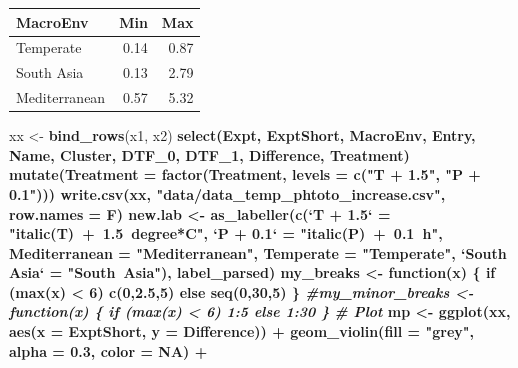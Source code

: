\documentclass[
]{article}
\newenvironment{Shaded}{\begin{snugshade}}{\end{snugshade}}
\newcommand{\CommentTok}[1]{\textcolor[rgb]{0.56,0.35,0.01}{\textit{#1}}}
\newcommand{\ControlFlowTok}[1]{\textcolor[rgb]{0.13,0.29,0.53}{\textbf{#1}}}
\newcommand{\DataTypeTok}[1]{\textcolor[rgb]{0.13,0.29,0.53}{#1}}
\newcommand{\DecValTok}[1]{\textcolor[rgb]{0.00,0.00,0.81}{#1}}
\newcommand{\FloatTok}[1]{\textcolor[rgb]{0.00,0.00,0.81}{#1}}
\newcommand{\KeywordTok}[1]{\textcolor[rgb]{0.13,0.29,0.53}{\textbf{#1}}}
\newcommand{\NormalTok}[1]{#1}
\newcommand{\OperatorTok}[1]{\textcolor[rgb]{0.81,0.36,0.00}{\textbf{#1}}}
\newcommand{\OtherTok}[1]{\textcolor[rgb]{0.56,0.35,0.01}{#1}}
\newcommand{\StringTok}[1]{\textcolor[rgb]{0.31,0.60,0.02}{#1}}
\begin{document}
\begin{longtable}[]{@{}lrr@{}}
\toprule
MacroEnv & Min & Max\tabularnewline
\midrule
\endhead
Temperate & 0.14 & 0.87\tabularnewline
South Asia & 0.13 & 2.79\tabularnewline
Mediterranean & 0.57 & 5.32\tabularnewline
\bottomrule
\end{longtable}

\begin{Shaded}
\begin{Highlighting}[]
\NormalTok{xx <-}\StringTok{ }\KeywordTok{bind_rows}\NormalTok{(x1, x2) }\OperatorTok{%
\StringTok{  }\KeywordTok{select}\NormalTok{(Expt, ExptShort, MacroEnv, Entry, Name, Cluster, }
\NormalTok{         DTF_}\DecValTok{0}\NormalTok{, DTF_}\DecValTok{1}\NormalTok{, Difference, Treatment) }\OperatorTok{%
\StringTok{  }\KeywordTok{mutate}\NormalTok{(}\DataTypeTok{Treatment =} \KeywordTok{factor}\NormalTok{(Treatment, }\DataTypeTok{levels =} \KeywordTok{c}\NormalTok{(}\StringTok{"T + 1.5"}\NormalTok{, }\StringTok{"P + 0.1"}\NormalTok{)))}
\KeywordTok{write.csv}\NormalTok{(xx, }\StringTok{"data/data_temp_phtoto_increase.csv"}\NormalTok{, }\DataTypeTok{row.names =}\NormalTok{ F)}
\NormalTok{new.lab <-}\StringTok{ }\KeywordTok{as_labeller}\NormalTok{(}\KeywordTok{c}\NormalTok{(}\StringTok{`}\DataTypeTok{T + 1.5}\StringTok{`}\NormalTok{ =}\StringTok{ "italic(T)~+~1.5~degree*C"}\NormalTok{, }
    \StringTok{`}\DataTypeTok{P + 0.1}\StringTok{`}\NormalTok{ =}\StringTok{ "italic(P)~+~0.1~h"}\NormalTok{, }\DataTypeTok{Mediterranean =} \StringTok{"Mediterranean"}\NormalTok{, }
    \DataTypeTok{Temperate =} \StringTok{"Temperate"}\NormalTok{, }\StringTok{`}\DataTypeTok{South Asia}\StringTok{`}\NormalTok{ =}\StringTok{ "South~Asia"}\NormalTok{), label_parsed)}
\NormalTok{my_breaks <-}\StringTok{ }\ControlFlowTok{function}\NormalTok{(x) \{ }\ControlFlowTok{if}\NormalTok{ (}\KeywordTok{max}\NormalTok{(x) }\OperatorTok{<}\StringTok{ }\DecValTok{6}\NormalTok{) }\KeywordTok{c}\NormalTok{(}\DecValTok{0}\NormalTok{,}\FloatTok{2.5}\NormalTok{,}\DecValTok{5}\NormalTok{) }\ControlFlowTok{else} \KeywordTok{seq}\NormalTok{(}\DecValTok{0}\NormalTok{,}\DecValTok{30}\NormalTok{,}\DecValTok{5}\NormalTok{) \}}
\CommentTok{#my_minor_breaks <- function(x) \{ if (max(x) < 6) 1:5 else 1:30 \}}
\CommentTok{# Plot }
\NormalTok{mp <-}\StringTok{ }\KeywordTok{ggplot}\NormalTok{(xx, }\KeywordTok{aes}\NormalTok{(}\DataTypeTok{x =}\NormalTok{ ExptShort, }\DataTypeTok{y =}\NormalTok{ Difference)) }\OperatorTok{+}\StringTok{ }
\StringTok{  }\KeywordTok{geom_violin}\NormalTok{(}\DataTypeTok{fill =} \StringTok{"grey"}\NormalTok{, }\DataTypeTok{alpha =} \FloatTok{0.3}\NormalTok{, }\DataTypeTok{color =} \OtherTok{NA}\NormalTok{) }\OperatorTok{+}\StringTok{ }
}}
\end{Highlighting}
\end{Shaded}
\end{document}
